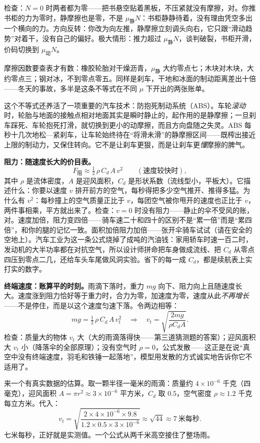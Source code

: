 检查：\(N=0\) 时两者都为零——把书悬空贴着黑板，不压紧就没有摩擦，对。你推书柜的力为零时，静摩擦也是零，不是 \(\mu_{\text{静}}N\)：书柜静静待着，没有理由凭空多出一个横向的力。方向反转：你改为向左推，静摩擦立刻调头向右，它只跟“滑动趋势”对着干，没有自己的偏好。极大情形：推力超过 \(\mu_{\text{静}}N\)，谈判破裂，书柜开滑，价码切换到 \(\mu_{\text{动}}N\)。

摩擦因数要查表才有数：橡胶轮胎对干燥沥青，\(\mu_{\text{静}}\) 大约零点七；木块对木块，大约零点三；钢对冰，不到零点零五。同样是刹车，干地和冰面的制动距离差出十倍——冬天的事故，多半是这条不等式在不同 \(\mu\) 下开出的两张账单。

这个不等式还养活了一项重要的汽车技术：防抱死制动系统（ABS）。车轮\emph{滚动}时，轮胎与地面的接触点相对地面其实是瞬时静止的，起作用的是静摩擦；一旦刹车踩死、车轮抱死打滑，就切换到更小的动摩擦，而且方向盘随之失灵。ABS 每秒十几次地松—紧刹车，让车轮始终待在“将滑未滑”的静摩擦区间——既榨出接近上限的制动力，又保住转向。它不是让刹车更狠，而是让刹车更\emph{懂}摩擦的脾气。

\textbf{阻力：随速度长大的价目表。}
\[
F_{\text{阻}}\approx \tfrac12\,\rho\, C_d\, A\, v^2 \qquad(\text{速度较快时}),
\]
其中 \(\rho\) 是流体密度，\(A\) 是迎风面积，\(C_d\) 是形状系数（流线型小，平板大）。它描述什么：你要以速度 \(v\) 排开前方的空气，每秒得把多少空气推开、推得多猛。为什么有 \(v^2\)：每秒撞上的空气质量正比于 \(v\)，每团空气被你甩开的速度也正比于 \(v\)，两件事相乘，平方就出来了。检查：\(v=0\) 时没有阻力——静止的伞不受风的账，对。速度加倍，阻力变四倍——骑车速二十和四十的区别不是“累一倍”而是“累四倍”，和你的腿的记忆一致。面积加倍阻力加倍——张开伞骑车试试（请在安全的空地上）。汽车工业为这一条公式烧掉了成吨的汽油钱：家用轿车时速一百二时，发动机的大半功率都在对抗空气，所以设计师拼命把车身做成流线、把 \(C_d\) 从零点四压到零点二几，还给车头车尾做风洞实验。省下的每一成 \(C_d\)，都是续航表上实打实的数字。

\textbf{终端速度：账算平的时刻。}雨滴下落时，重力 \(mg\) 向下、阻力向上且随速度长大。速度涨到阻力恰好等于重力时，合力为零，加速度为零，速度从此\emph{不再增长}——不是停住，而是以这个速度匀速下落。令两边相等：
\[
mg=\tfrac12\,\rho\, C_d\, A\, v_t^2
\quad\Longrightarrow\quad
v_t=\sqrt{\dfrac{2mg}{\rho C_d A}} .
\]
检查：质量大的物体 \(v_t\) 大（大的雨滴落得快——第三道猜测题的答案）；迎风面积大 \(v_t\) 小（降落伞的全部原理）；没有空气时 \(\rho=0\)，公式发散——这正是在说“真空中没有终端速度，羽毛和铁锤一起落地”，模型用发散的方式诚实地告诉你它不适用了。

来一个有真实数据的估算。取一颗半径一毫米的雨滴：质量约 \(4\times10^{-6}\) 千克（四毫克），迎风面积 \(A=\pi r^2\approx3\times10^{-6}\) 平方米，\(C_d\) 取 \(0.5\)，空气密度 \(\rho\approx1.2\) 千克每立方米。代入：
\[
v_t=\sqrt{\dfrac{2\times4\times10^{-6}\times9.8}{1.2\times0.5\times3\times10^{-6}}}
\approx\sqrt{44}\approx 7\ \text{米每秒}.
\]
七米每秒，正好就是实测值。一个公式从两千米高空接住了整场雨。

